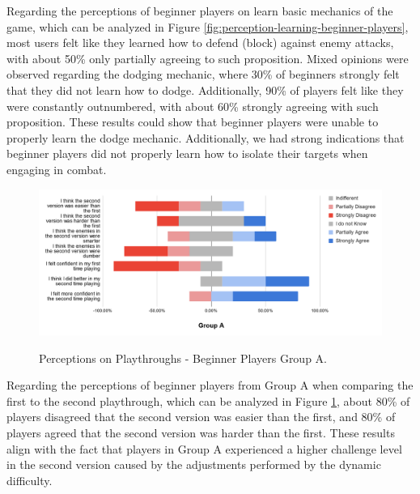 Regarding the perceptions of beginner players on learn basic mechanics of the game, which can be analyzed in Figure \ref{fig:perception-learning-beginner-players}, most users felt like they learned how to defend (block) against enemy attacks, with about 50\% only partially agreeing to such proposition. Mixed opinions were observed regarding the dodging mechanic, where 30\% of beginners strongly felt that they did not learn how to dodge. Additionally, 90\% of players felt like they were constantly outnumbered, with about 60\% strongly agreeing with such proposition. These results could show that beginner players were unable to properly learn the dodge mechanic. Additionally, we had strong indications that beginner players did not properly learn how to isolate their targets when engaging in combat.

\begin{figure}[ht]
    \begin{center}
    \caption{Perceptions on Playthroughs - Beginner Players Group A.}
        \includegraphics[width=36em]{figures/fig-perception-versions-beginner-players-group-a.png}
        \label{fig:perception-playthrough-beginner-players-group-a}
    \end{center}
\end{figure}

Regarding the perceptions of beginner players from Group A when comparing the first to the second playthrough, which can be analyzed in Figure \ref{fig:perception-playthrough-beginner-players-group-a}, about 80\% of players disagreed that the second version was easier than the first, and 80\% of players agreed that the second version was harder than the first. These results align with the fact that players in Group A experienced a higher challenge level in the second version caused by the adjustments performed by the dynamic difficulty.

